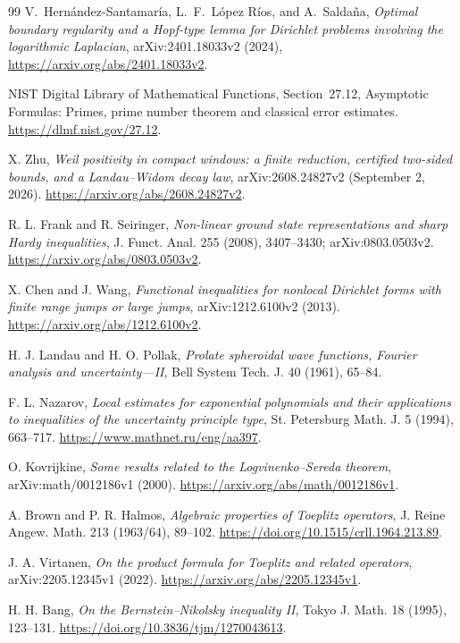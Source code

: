 \documentclass[11pt]{article}
\theoremstyle{remark}
\begin{document}
\begin{thebibliography}{99}
V.~Hern\'andez-Santamar\'ia, L.~F.~L\'opez R\'ios, and A.~Salda\~na,
\emph{Optimal boundary regularity and a Hopf-type lemma for Dirichlet
problems involving the logarithmic Laplacian},
arXiv:2401.18033v2 (2024),
\url{https://arxiv.org/abs/2401.18033v2}.

NIST Digital Library of Mathematical Functions, Section~27.12,
Asymptotic Formulas: Primes, prime number theorem and classical error
estimates. \url{https://dlmf.nist.gov/27.12}.

X. Zhu, \emph{Weil positivity in compact windows: a finite reduction,
certified two-sided bounds, and a Landau--Widom decay law},
arXiv:2608.24827v2 (September 2, 2026).
\url{https://arxiv.org/abs/2608.24827v2}.

R. L. Frank and R. Seiringer,
\emph{Non-linear ground state representations and sharp Hardy inequalities},
J. Funct. Anal. 255 (2008), 3407--3430;
arXiv:0803.0503v2.
\url{https://arxiv.org/abs/0803.0503v2}.

X. Chen and J. Wang,
\emph{Functional inequalities for nonlocal Dirichlet forms with finite
range jumps or large jumps},
arXiv:1212.6100v2 (2013).
\url{https://arxiv.org/abs/1212.6100v2}.

H. J. Landau and H. O. Pollak,
\emph{Prolate spheroidal wave functions, Fourier analysis and
uncertainty---II},
Bell System Tech. J. 40 (1961), 65--84.

F. L. Nazarov,
\emph{Local estimates for exponential polynomials and their
applications to inequalities of the uncertainty principle type},
St. Petersburg Math. J. 5 (1994), 663--717.
\url{https://www.mathnet.ru/eng/aa397}.

O. Kovrijkine,
\emph{Some results related to the Logvinenko--Sereda theorem},
arXiv:math/0012186v1 (2000).
\url{https://arxiv.org/abs/math/0012186v1}.

A. Brown and P. R. Halmos,
\emph{Algebraic properties of Toeplitz operators},
J. Reine Angew. Math. 213 (1963/64), 89--102.
\url{https://doi.org/10.1515/crll.1964.213.89}.

J. A. Virtanen,
\emph{On the product formula for Toeplitz and related operators},
arXiv:2205.12345v1 (2022).
\url{https://arxiv.org/abs/2205.12345v1}.

H. H. Bang,
\emph{On the Bernstein--Nikolsky inequality II},
Tokyo J. Math. 18 (1995), 123--131.
\url{https://doi.org/10.3836/tjm/1270043613}.

\end{thebibliography}
\end{document}
